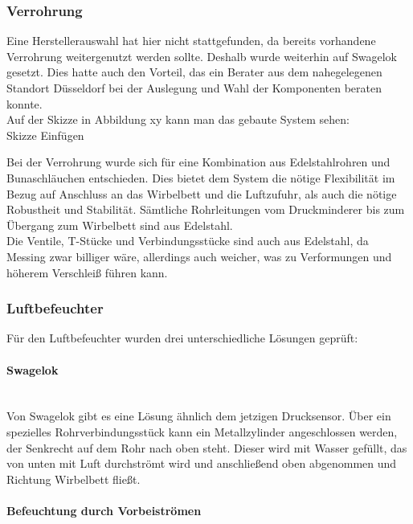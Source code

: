 \subsubsection{Verrohrung}

Eine Herstellerauswahl hat hier nicht stattgefunden, da bereits vorhandene Verrohrung weitergenutzt werden sollte. Deshalb wurde weiterhin auf Swagelok gesetzt. Dies hatte auch den Vorteil, das ein Berater aus dem nahegelegenen Standort Düsseldorf bei der Auslegung und Wahl der Komponenten beraten konnte. \\
Auf der Skizze in Abbildung xy kann man das gebaute System sehen:
\hfill \\

Skizze Einfügen


Bei der Verrohrung wurde sich für eine Kombination aus Edelstahlrohren und Bunaschläuchen entschieden. Dies bietet dem System die nötige Flexibilität im Bezug auf Anschluss an das Wirbelbett und die Luftzufuhr, als auch die nötige Robustheit und Stabilität. Sämtliche Rohrleitungen vom Druckminderer bis zum Übergang zum Wirbelbett sind aus Edelstahl. \\
Die Ventile, T-Stücke und Verbindungsstücke sind auch aus Edelstahl, da Messing zwar billiger wäre, allerdings auch weicher, was zu Verformungen und höherem Verschleiß führen kann.


\subsubsection{Luftbefeuchter}

Für den Luftbefeuchter wurden drei unterschiedliche Lösungen geprüft:

\paragraph{Swagelok} 

\hfill \\

Von Swagelok gibt es eine Lösung ähnlich dem jetzigen Drucksensor. Über ein spezielles Rohrverbindungsstück kann ein Metallzylinder angeschlossen werden, der Senkrecht auf dem Rohr nach oben steht. Dieser wird mit Wasser gefüllt, das von unten mit Luft durchströmt wird und anschließend oben abgenommen und Richtung Wirbelbett fließt.

\paragraph{Befeuchtung durch Vorbeiströmen}


